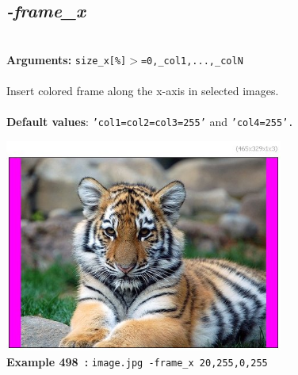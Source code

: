 \documentclass[a4paper,11pt,twoside]{book}
\begin{document}
\subsection{\emph{-frame\_x} }\vspace*{-0.5em}
~\\\textbf{Arguments: } 
{\small \texttt{size\_x[\%]$>$=0,\_col1,...,\_colN}}\\~\\
Insert colored frame along the x-axis in selected images.
~\\~\\\textbf{Default values}: {\small \texttt{'col1=col2=col3=255'} and \texttt{'col4=255'.}}
\begin{center}\includegraphics[keepaspectratio=true,height=7cm,width=\textwidth]{img/gmic_def498.jpg}\\
{\footnotesize \textbf{Example 498~:} \texttt{image.jpg -frame\_x 20,255,0,255}}
\end{center}
\end{document}
